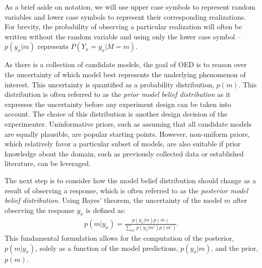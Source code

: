 \documentclass[11pt]{article}
\begin{document}
As a brief aside on notation, we will use upper case symbols to represent random variables and lower case symbols to represent their corresponding realizations. For brevity, the probability of observing a particular realization will often be written without the random variable and using only the lower case symbol -- $p(y_x|m)$ represents $P(Y_x = y_x | M = m)$.

As there is a collection of candidate models, the goal of OED is to reason over the uncertainty of which model best represents the underlying phenomenon of interest. This uncertainty is quantified as a probability distribution, $p(m)$. This distribution is often referred to as the \emph{prior model belief distribution} as it expresses the uncertainty before any experiment design can be taken into account. The choice of this distribution is another design decision of the experimenter. Uninformative priors, such as assuming that all candidate models are equally plausible, are popular starting points. However, non-uniform priors, which relatively favor a particular subset of models, are also suitable if prior knowledge about the domain, such as previously collected data or established literature, can be leveraged. 

The next step is to consider how the model belief distribution should change as a result of observing a response, which is often referred to as the \emph{posterior model belief distribution}. Using Bayes' theorem, the uncertainty of the model $m$ after observing the response $y_x$ is defined as:
\begin{align}
p(m|y_x) = \frac{p(y_x|m)p(m)}{\sum\limits_{m'} p(y_x|m')p(m')}. \label{eq:bayes}
\end{align}
This fundamental formulation allows for the computation of the posterior, $p(m|y_x)$, solely as a function of the model predictions, $p(y_x|m)$, and the prior, $p(m)$.
\end{document}
